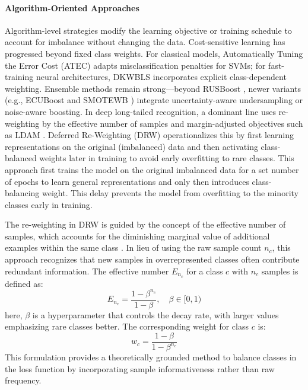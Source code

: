 \paragraph{Algorithm-Oriented Approaches} Algorithm-level strategies modify the learning objective or training schedule to account for imbalance without changing the data. Cost-sensitive learning has progressed beyond fixed class weights. For classical models, Automatically Tuning the Error Cost (ATEC) \cite{cao2020expediting} adapts misclassification penalties for SVMs; for fast-training neural architectures, DKWBLS \cite{chen2022double} incorporates explicit class-dependent weighting. Ensemble methods remain strong—beyond RUSBoost \cite{seiffert2009rusboost}, newer variants (e.g., ECUBoost \cite{wang2020entropy} and SMOTEWB \cite{saglam2022novel}) integrate uncertainty-aware undersampling or noise-aware boosting. In deep long-tailed recognition, a dominant line uses re-weighting by the effective number of samples \cite{cui2019classbalanced} and margin-adjusted objectives such as LDAM \cite{cao2019learning}. Deferred Re-Weighting (DRW) \cite{cao2019learning} operationalizes this by first learning representations on the original (imbalanced) data and then activating class-balanced weights later in training to avoid early overfitting to rare classes. This approach first trains the model on the original imbalanced data for a set number of epochs to learn general representations and only then introduces class-balancing weight. This delay prevents the model from overfitting to the minority classes early in training.

The re-weighting in DRW is guided by the concept of the effective number of samples, which accounts for the diminishing marginal value of additional examples within the same class \cite{cui2019classbalanced}. In lieu of using the raw sample count \(n_c\), this approach recognizes that new samples in overrepresented classes often contribute redundant information. The effective number $E_{n_c}$ for a class $c$ with $n_c$ samples is defined as:
\begin{equation}
E_{n_c} = \frac{1 - \beta^{n_c}}{1 - \beta}, \quad \beta \in [0, 1)
\end{equation}
here, $\beta$ is a hyperparameter that controls the decay rate, with larger values emphasizing rare classes better. The corresponding weight for class $c$ is:
\begin{equation}
w_c = \frac{1 - \beta}{1 - \beta^{n_c}}
\end{equation}
This formulation provides a theoretically grounded method to balance classes in the loss function by incorporating sample informativeness rather than raw frequency.

